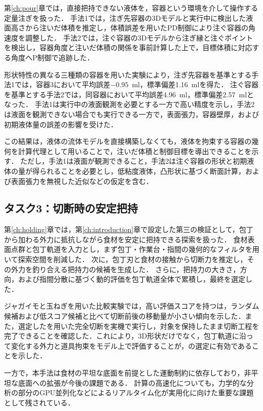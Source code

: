 第\ref{ch:pour}章では，直接把持できない液体を，容器という環境を介して操作する定量注ぎを扱った．
手法1では，注ぎ先容器の3Dモデルと実行中に検出した液面高さから注いだ体積を推定し，体積誤差を用いたPD制御により注ぐ容器の角速度を調整した．
手法2では，注ぐ容器の3Dモデルから注ぎ縁と注ぐポイントを検出し，容器角度と注いだ体積の関係を事前計算した上で，目標体積に対応する角度へP制御で追跡した．

形状特性の異なる三種類の容器を用いた実験により，注ぎ先容器を基準とする手法1では，容器3において平均誤差$-0.95$~ml，標準偏差1.16~mlを得た．
注ぐ容器を基準とする手法2では，同容器において平均誤差4.96~ml，標準偏差2.57~mlとなった．
手法1は実行中の液面観測を必要とする一方で高い精度を示し，手法2は液面を観測できない場合でも実行できる一方で，表面張力，容器壁厚，および初期液体量の誤差の影響を受けた．

この結果は，液体の流体モデルを直接構築しなくても，液体を拘束する容器の幾何を計算代理として用いることで，注いだ体積と制御目標を導出できることを示す．
ただし，手法1は液面が観測できること，手法2は注ぐ容器の形状と初期液体の量が得られることを必要とし，低粘度液体，凸形状に基づく断面計算，および表面張力を無視した近似などの仮定を含む．

\subsection{タスク3：切断時の安定把持}
\label{subsec:conclusion_holding}

第\ref{ch:holding}章では，第\ref{ch:introduction}章で設定した第三の検証として，包丁から加わる外力に抵抗しながら食材を安定に把持できる{\nameholdingpointset}探索を扱った．
食材表面点群と包丁軌道を入力とし，まず包丁・作業台・指間の幾何的なフィルタを用いて探索空間を削減した．
次に，包丁刃と食材の接触から切断力を推定し，その外力を釣り合える把持力の候補を生成した．
さらに，把持力の大きさ，方向，および指間分散に基づく動的評価を包丁軌道全体で累積し，最終{\nameholdingpointset}を選定した．

ジャガイモと玉ねぎを用いた比較実験では，高い評価スコアを持つ{\nameholdingpointset}は，ランダム候補および低スコア候補と比べて切断前後の移動量が小さい傾向を示した．また，選定した{\nameholdingpointset}を用いた完全切断を実機で実行し，対象を保持したまま切断工程を完了できることを確認した．これにより，3D形状だけでなく，包丁軌道に沿って変化する外力と道具拘束をモデル上で評価することが，{\nameholdingpointset}の選定に有効であることを示した．

一方で，本手法は食材の平坦な底面を前提とした運動制約に依存しており，非平坦な底面への拡張が今後の課題である．
計算の高速化についても，力学的な分析の部分のGPU並列化などによるリアルタイム化が実用化に向けた重要な課題として残されている．


